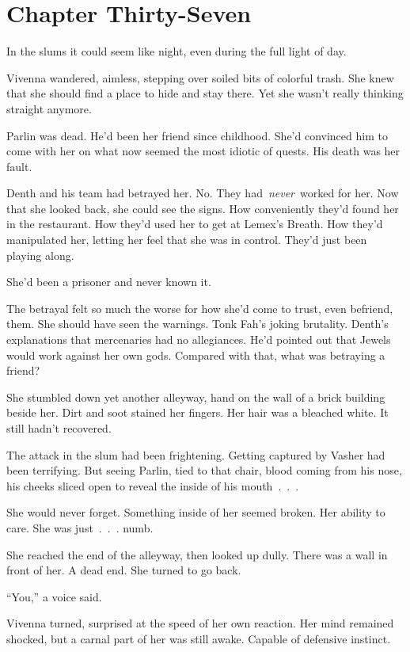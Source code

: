 \section{Chapter Thirty-Seven}

In the slums it could seem like night, even during the full light of day.

Vivenna wandered, aimless, stepping over soiled bits of colorful trash. She knew that she should find a place to hide and stay there. Yet she wasn’t really thinking straight anymore.

Parlin was dead. He’d been her friend since childhood. She’d convinced him to come with her on what now seemed the most idiotic of quests. His death was her fault.

Denth and his team had betrayed her. No. They had~\textit{never}~worked for her. Now that she looked back, she could see the signs. How conveniently they’d found her in the restaurant. How they’d used her to get at Lemex’s Breath. How they’d manipulated her, letting her feel that she was in control. They’d just been playing along.

She’d been a prisoner and never known it.

The betrayal felt so much the worse for how she’d come to trust, even befriend, them. She should have seen the warnings. Tonk Fah’s joking brutality. Denth’s explanations that mercenaries had no allegiances. He’d pointed out that Jewels would work against her own gods. Compared with that, what was betraying a friend?

She stumbled down yet another alleyway, hand on the wall of a brick building beside her. Dirt and soot stained her fingers. Her hair was a bleached white. It still hadn’t recovered.

The attack in the slum had been frightening. Getting captured by Vasher had been terrifying. But seeing Parlin, tied to that chair, blood coming from his nose, his cheeks sliced open to reveal the inside of his mouth~.~.~.

She would never forget. Something inside of her seemed broken. Her ability to care. She was just~.~.~. numb.

She reached the end of the alleyway, then looked up dully. There was a wall in front of her. A dead end. She turned to go back.

“You,” a voice said.

Vivenna turned, surprised at the speed of her own reaction. Her mind remained shocked, but a carnal part of her was still awake. Capable of defensive instinct.

